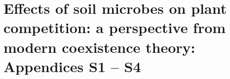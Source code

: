 \chapter{Effects of soil microbes on plant competition: a perspective from modern coexistence theory: Appendices S1 -- S4}
\fancyhead[LE, RO]{\thepage}
\fancyfoot{}
\renewcommand{\headrulewidth}{0pt}
\setlength{\parindent}{1cm}

